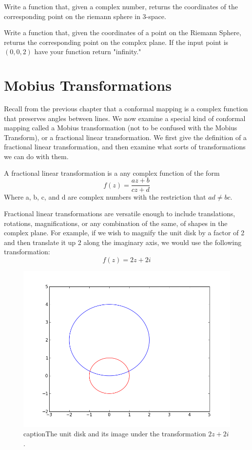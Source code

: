 \begin{problem}  Write a function that, given a complex number, returns the coordinates of the corresponding point on the riemann sphere in 3-space.
\end{problem}

\begin{problem}
Write a function that, given the coordinates of a point on the Riemann Sphere, returns the corresponding point on the complex plane.
If the input point is $(0,0,2)$ have your function return "infinity."
\end{problem}

\section*{Mobius Transformations}

Recall from the previous chapter that a conformal mapping is a complex function that preserves angles between lines.
We now examine a special kind of conformal mapping called a Mobius transformation (not to be confused with the Mobius Transform), or a fractional linear transformation.
We first give the definition of a fractional linear transformation, and then examine what sorts of transformations we can do with them.

\begin{definition} A fractional linear transformation is a any complex function of the form
\[
f(z) = \frac{az + b}{cz + d}
\]
 Where a, b, c, and d are complex numbers with the restriction that $ad \neq bc$.
\end{definition}

Fractional linear transformations are versatile enough to include translations, rotations, magnifications, or any combination of the same, of shapes in the complex plane.
For example, if we wish to magnify the unit disk by a factor of 2 and then translate it up 2 along the imaginary axis, we would use the following transformation:
\[
f(z)=2z+2i
\]

\begin{figure}
\includegraphics[width=\textwidth]{mobius1.png}
caption{The unit disk and its image under the transformation $2z+2i$.}
\label{riemann:mobius1}
\end{figure}

